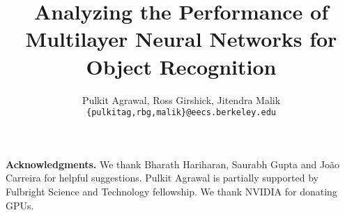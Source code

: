 \documentclass[runningheads]{llncs}
\begin{document}
\pagestyle{headings}
\mainmatter
\title{Analyzing the Performance of Multilayer Neural Networks for Object Recognition} %




\author{Pulkit Agrawal, Ross Girshick, Jitendra Malik\\
\texttt{\small \{pulkitag,rbg,malik\}@eecs.berkeley.edu}}


\maketitle





%
%




{\small
\smallskip
\noindent \textbf{Acknowledgments.}
We thank Bharath Hariharan, Saurabh Gupta and Jo\~{a}o Carreira for helpful suggestions. Pulkit Agrawal is partially supported by Fulbright Science and Technology fellowship. We thank NVIDIA for donating GPUs.}





\end{document}
